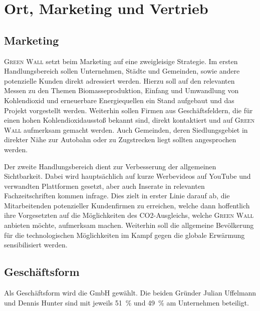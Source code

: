\chapter{Ort, Marketing und Vertrieb}

    \section{Marketing}

        \textsc{Green Wall} setzt beim Marketing auf eine zweigleisige Strategie.
        Im ersten Handlungsbereich sollen Unternehmen, Städte und Gemeinden, sowie andere potenzielle Kunden direkt adressiert werden.
        Hierzu soll auf den relevanten Messen zu den Themen Biomasseproduktion, Einfang und Umwandlung von Kohlendioxid und erneuerbare Energiequellen ein Stand aufgebaut und das Projekt vorgestellt werden.
        Weiterhin sollen Firmen aus Geschäftsfeldern, die für einen hohen Kohlendioxidausstoß bekannt sind, direkt kontaktiert und auf \textsc{Green Wall} aufmerksam gemacht werden.
        Auch Gemeinden, deren Siedlungsgebiet in direkter Nähe zur Autobahn oder zu Zugstrecken liegt sollten angesprochen werden.

        Der zweite Handlungsbereich dient zur Verbesserung der allgemeinen Sichtbarkeit.
        Dabei wird hauptsächlich auf kurze Werbevideos auf YouTube und verwandten Plattformen gesetzt, aber auch Inserate in relevanten Fachzeitschriften kommen infrage.
        Dies zielt in erster Linie darauf ab, die Mitarbeitenden potenzieller Kundenfirmen zu erreichen, welche dann hoffentlich ihre Vorgesetzten auf die Möglichkeiten des CO2-Ausgleichs, welche \textsc{Green Wall} anbieten möchte, aufmerksam machen.
        Weiterhin soll die allgemeine Bevölkerung für die technologischen Möglichkeiten im Kampf gegen die globale Erwärmung sensibilisiert werden.

    \section{Geschäftsform}

        Als Geschäftsform wird die GmbH gewählt.
        Die beiden Gründer Julian Uffelmann und Dennis Hunter sind mit jeweils \qty{51}{\percent} und \qty{49}{\percent} am Unternehmen beteiligt. 